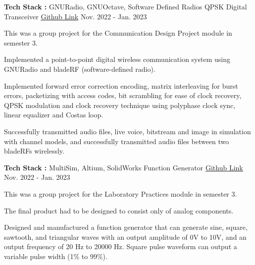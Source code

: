 \begin{cventries}
\cventry
{\textbf{Tech Stack :} GNURadio, GNUOctave, Software Defined Radios} %
{QPSK Digital Transceiver} %
{\href{https://github.com/VijthanKurrshanth/QPSK-Tranciever-GnuRadio}{Github Link}} %
{Nov. 2022 - Jan. 2023} %
{ %
\begin{cvitems}
\item {This was a group project for the Communication Design Project module in semester 3.}
\item {Implemented a point-to-point digital wireless communication system using GNURadio and bladeRF (software-defined radio).}
\item {Implemented forward error correction encoding, matrix interleaving for burst errors, packetizing with access codes, bit scrambling for ease of clock recovery, QPSK modulation and clock recovery technique using polyphase clock sync, linear equalizer and Costas loop.} 
\item {Successfully transmitted audio files, live voice, bitstream and image in simulation with channel models, and successfully transmitted audio files between two bladeRFs wirelessly.}
\end{cvitems}
}


\cventry
{\textbf{Tech Stack :} MultiSim, Altium, SolidWorks} %
{Function Generator} %
{\href{https://github.com/VijthanKurrshanth/Function_Generator}{Github Link}} %
{Nov. 2022 - Jan. 2023} %
{ %
\begin{cvitems}
\item {This was a group project for the Laboratory Practices module in semester 3.}
\item {The final product had to be designed to consist only of analog components.}
\item {Designed and manufactured a function generator that can generate sine, square, sawtooth, and triangular waves with an output amplitude of 0V to 10V, and an output frequency of 20 Hz to 20000 Hz. Square pulse waveform can output a variable pulse width (1\% to 99\%).}
\end{cvitems}
}


\end{cventries}